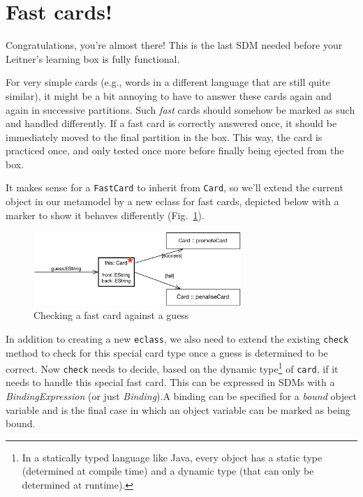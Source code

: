 \newpage
\section{Fast cards!}
\genHeader
\hypertarget{sec:fastCard}{}

Congratulations, you're almost there! This is the last SDM needed before your Leitner's learning box is fully functional.

For very simple cards (e.g., words in a different language that are still quite similar), it might be a bit annoying to have to answer these cards again and
again in successive partitions. Such \emph{fast} cards should somehow be marked as such and handled differently. If a fast card is correctly answered once, it
should be immediately moved to the final partition in the box. This way, the card is practiced once, and only tested once more before finally being ejected from the
box.

It makes sense for a \texttt{FastCard} to inherit from \texttt{Card}, so we'll extend the current object in our metamodel by a new eclass for fast cards, 
depicted below with a marker to show it behaves differently (Fig.~\ref{fig:goal_fastCard}).

\begin{figure}[htbp]
	\centering
    \includegraphics[width=0.7\textwidth]{goal_fastCard}
	\caption{Checking a fast card against a guess}
	\label{fig:goal_fastCard}
\end{figure}
\FloatBarrier

In addition to creating a new \texttt{eclass}, we also need to extend the existing \texttt{check} method to check for this special card type once a guess is
determined to be correct. Now \texttt{check} needs to decide, based on the dynamic type\footnote{In a statically typed language like Java, every
object has a static type (determined at compile time) and a dynamic type (that can only be determined at runtime).} of \texttt{card}, if it needs to handle this special fast card. This
can be expressed in SDMs with a \emph{BindingExpression} (or just \emph{Binding}).A binding can be specified for a \emph{bound} object variable
and is the final case in which an object variable can be marked as being bound.

